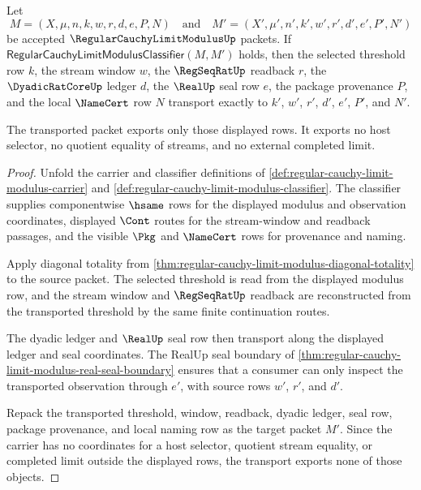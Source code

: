 \begin{theorem}
\label{thm:regular-cauchy-limit-modulus-classifier-transport-exactness}
Let
$$
M=(X,\mu,n,k,w,r,d,e,P,N)
\quad\text{and}\quad
M'=(X',\mu',n',k',w',r',d',e',P',N')
$$
be accepted $\RegularCauchyLimitModulusUp$ packets. If
$\mathsf{RegularCauchyLimitModulusClassifier}(M,M')$ holds, then the selected threshold row $k$, the stream window $w$, the $\RegSeqRatUp$ readback $r$, the $\DyadicRatCoreUp$ ledger $d$, the $\RealUp$ seal row $e$, the package provenance $P$, and the local $\NameCert$ row $N$ transport exactly to $k'$, $w'$, $r'$, $d'$, $e'$, $P'$, and $N'$.

The transported packet exports only those displayed rows. It exports no host selector, no quotient equality of streams, and no external completed limit.
\end{theorem}
\begin{proof}
Unfold the carrier and classifier definitions of \autoref{def:regular-cauchy-limit-modulus-carrier} and \autoref{def:regular-cauchy-limit-modulus-classifier}. The classifier supplies componentwise $\hsame$ rows for the displayed modulus and observation coordinates, displayed $\Cont$ routes for the stream-window and readback passages, and the visible $\Pkg$ and $\NameCert$ rows for provenance and naming.

Apply diagonal totality from \autoref{thm:regular-cauchy-limit-modulus-diagonal-totality} to the source packet. The selected threshold is read from the displayed modulus row, and the stream window and $\RegSeqRatUp$ readback are reconstructed from the transported threshold by the same finite continuation routes.

The dyadic ledger and $\RealUp$ seal row then transport along the displayed ledger and seal coordinates. The RealUp seal boundary of \autoref{thm:regular-cauchy-limit-modulus-real-seal-boundary} ensures that a consumer can only inspect the transported observation through $e'$, with source rows $w'$, $r'$, and $d'$.

Repack the transported threshold, window, readback, dyadic ledger, seal row, package provenance, and local naming row as the target packet $M'$. Since the carrier has no coordinates for a host selector, quotient stream equality, or completed limit outside the displayed rows, the transport exports none of those objects.
\end{proof}

